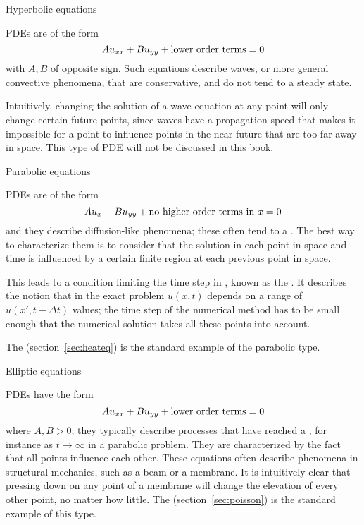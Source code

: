  {Hyperbolic equations}

\acp{PDE} are of the form
\begin{equation}
  Au_{xx}+Bu_{yy}+\hbox{lower order terms} =0
\end{equation}
with $A,B$ of opposite sign. Such equations describe waves,
or more general convective phenomena, that are conservative,
and do not tend to a steady state.

Intuitively, changing the solution of a wave equation at any point
will only change certain future points, since waves have a propagation
speed that makes it impossible for a point to influence points in the
near future that are too far away in space. This type of \ac{PDE} will
not be discussed in this book.

 {Parabolic equations}

\acp{PDE} are of the form
\begin{equation}
  Au_x+Bu_{yy}+\hbox{no higher order terms in $x$}=0
\end{equation}
and they describe diffusion-like phenomena; these often tend to a
. The best way to
characterize them is to consider that the solution in each point in
space and time is influenced by a certain finite region at each
previous point in space.

\begin{remark}
  This leads to a condition limiting
  the time step in , known as the
  .
  It describes the notion that in the exact problem $u(x,t)$ depends
  on a range of $u(x',t-\Delta t)$ values; the time step of the
  numerical method has to be small enough that the numerical solution
  takes all these points into account.
\end{remark}

The 
(section~\ref{sec:heateq}) is the standard example of the parabolic type.

 {Elliptic equations}
\label{sec:elliptic}

\acp{PDE} have the form 
\begin{equation}
  Au_{xx}+Bu_{yy}+\hbox{lower order terms} =0
\end{equation}
where $A,B>0$; they typically describe processes that have reached a
, for instance as $t\rightarrow\infty$ in a parabolic
problem. They are characterized by the fact that all points influence
each other. These equations often describe phenomena in structural
mechanics, such as a beam or a membrane. It is intuitively clear that
pressing down on any point of a membrane will change the elevation of
every other point, no matter how little.
The 
(section~\ref{sec:poisson}) is the standard example of
this type.

